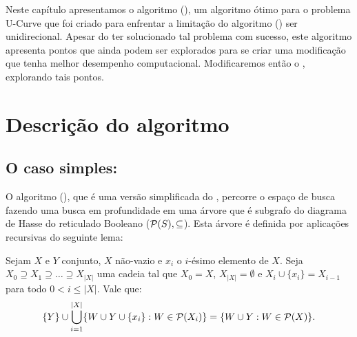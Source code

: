 Neste capítulo apresentamos o algoritmo  
(), um algoritmo ótimo para o problema U-Curve que foi 
criado para enfrentar a limitação do algoritmo  () ser unidirecional. Apesar do 
ter solucionado tal problema com sucesso, este algoritmo apresenta 
pontos que ainda podem ser explorados para se criar uma modificação que
tenha melhor desempenho computacional. Modificaremos então o 
, explorando tais pontos.

\section{Descrição do algoritmo}

\subsection{O caso simples: }
O algoritmo  (), que é 
uma versão simplificada do , percorre o espaço de busca 
fazendo uma busca em profundidade em uma árvore que é subgrafo do 
diagrama de Hasse do reticulado Booleano ($\mathcal{P} (S), \subseteq$). 
Esta árvore é definida por aplicações recursivas do seguinte lema:

\begin{mylemma}
\label{lemma:lower_forest}
Sejam $X$ e $Y$ conjunto, $X$ não-vazio e $x_i$ o $i$-ésimo 
elemento de $X$. Seja $X_0 \supseteq X_1 \supseteq \dots \supseteq 
X_{|X|}$ uma cadeia tal que $X_0 = X$, $X_{|X|} = \emptyset$ e $X_{i} 
\cup \{x_i\} = X_{i - 1}$ para todo $0 < i \leq |X|$. Vale que:
\begin{align*}
\{ Y \} \cup \bigcup_{i = 1}^{|X|} \{W \cup Y \cup \{x_i\} : W \in \mathcal{P} (X_i)\} = \{W \cup Y : W \in \mathcal{P} (X)\}.
\end{align*}
\end{mylemma} 


